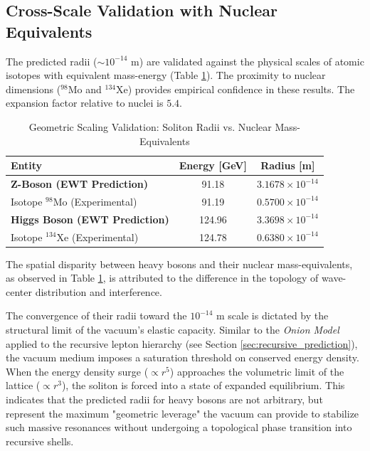 \documentclass[10pt,a4paper]{article}
\begin{document}
\subsection{Cross-Scale Validation with Nuclear Equivalents}
The predicted radii ($\sim 10^{-14}$ m) are validated against the physical scales of atomic isotopes with equivalent mass-energy (Table \ref{tab:boson_nuclear_comparison}). The proximity to nuclear dimensions ($^{98}\text{Mo}$ and $^{134}\text{Xe}$) provides empirical confidence in these results. The expansion factor relative to nuclei is  $5.4$. 

\begin{table}[ht]
	\centering
	\small
	\caption{Geometric Scaling Validation: Soliton Radii vs. Nuclear Mass-Equivalents}
	\label{tab:boson_nuclear_comparison}
	\begin{tabular}{lcc}
		\toprule
		\textbf{Entity} & \textbf{Energy [GeV]} & \textbf{Radius [m]} \\
		\midrule
		\textbf{Z-Boson (EWT Prediction)} & 91.18 & $3.1678 \times 10^{-14}$ \\
		Isotope $^{98}\text{Mo}$ (Experimental) & 91.19 & $0.5700 \times 10^{-14}$ \\
		\midrule
		\textbf{Higgs Boson (EWT Prediction)} & 124.96 & $3.3698 \times 10^{-14}$ \\
		Isotope $^{134}\text{Xe}$ (Experimental) & 124.78 & $0.6380 \times 10^{-14}$ \\
		\bottomrule
	\end{tabular}
\end{table}

The spatial disparity between heavy bosons and their nuclear mass-equivalents, as observed in Table \ref{tab:boson_nuclear_comparison}, is attributed to the  difference in the topology of wave-center distribution and interference.  

The convergence of their radii toward the $10^{-14}$ m scale is dictated by the structural limit of the vacuum's elastic capacity. Similar to the \textit{Onion Model} applied to the recursive lepton hierarchy (see Section \ref{sec:recursive_prediction}), the vacuum medium imposes a saturation threshold on conserved energy density. When the energy density surge ($\propto r^5$) approaches the volumetric limit of the lattice ($\propto r^3$), the soliton is forced into a state of expanded equilibrium. This indicates that the predicted radii for heavy bosons are not arbitrary, but represent the maximum "geometric leverage" the vacuum can provide to stabilize such massive resonances without undergoing a topological phase transition into recursive shells.
\end{document}
